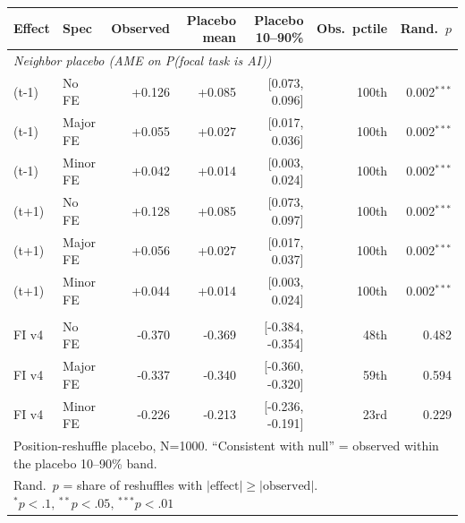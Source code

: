 \begin{tabular}{llrrrrr}
\toprule
Effect & Spec & Observed & Placebo mean & Placebo 10--90\% & Obs.\ pctile & Rand.\ $p$ \\
\midrule
\multicolumn{7}{l}{\textit{Neighbor placebo (AME on P(focal task is AI))}} \\
(t-1) & No FE & +0.126 & +0.085 & [0.073, 0.096] & 100th & 0.002$^{***}$ \\
(t-1) & Major FE & +0.055 & +0.027 & [0.017, 0.036] & 100th & 0.002$^{***}$ \\
(t-1) & Minor FE & +0.042 & +0.014 & [0.003, 0.024] & 100th & 0.002$^{***}$ \\
(t+1) & No FE & +0.128 & +0.085 & [0.073, 0.097] & 100th & 0.002$^{***}$ \\
(t+1) & Major FE & +0.056 & +0.027 & [0.017, 0.037] & 100th & 0.002$^{***}$ \\
(t+1) & Minor FE & +0.044 & +0.014 & [0.003, 0.024] & 100th & 0.002$^{***}$ \\
\addlinespace
\multicolumn{7}{l}{\textit{Fragmentation-index placebo (standardized $\beta$)}} \\
FI v4 & No FE & -0.370 & -0.369 & [-0.384, -0.354] & 48th & 0.482 \\
FI v4 & Major FE & -0.337 & -0.340 & [-0.360, -0.320] & 59th & 0.594 \\
FI v4 & Minor FE & -0.226 & -0.213 & [-0.236, -0.191] & 23rd & 0.229 \\
\bottomrule
\multicolumn{7}{l}{\footnotesize Position-reshuffle placebo, N=1000. ``Consistent with null'' = observed within the placebo 10--90\% band.} \\
\multicolumn{7}{l}{\footnotesize Rand.\ $p$ = share of reshuffles with $|\text{effect}|\ge|\text{observed}|$. $^{*}p{<}.1,\,^{**}p{<}.05,\,^{***}p{<}.01$} \\
\end{tabular}